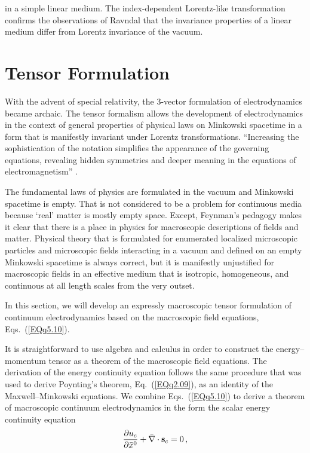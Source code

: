 \documentclass[twocolumn,amssymb,eqsecnum,aps,pra]{revtex4-2}
\begin{document}
in a simple linear medium.
The index-dependent Lorentz-like transformation confirms the
observations of Ravndal \cite{BIFinn} that the invariance properties
of a linear medium differ from Lorentz invariance of the vacuum.
\par
\section{Tensor Formulation}
\par
With the advent of special relativity, the 3-vector formulation of
electrodynamics became archaic.
The tensor formalism allows the development of electrodynamics in the
context of general properties of physical laws on Minkowski spacetime 
in a form that is manifestly invariant under Lorentz transformations.
``Increasing the sophistication of the notation simplifies the
appearance of the governing equations, revealing hidden symmetries
and deeper meaning in the equations of
electromagnetism'' \cite{BIWarnickR}.
\par
The fundamental laws of physics are formulated in the vacuum and
Minkowski spacetime is empty.
That is not considered to be a problem for continuous media
because `real' matter is mostly empty space.
Except, Feynman's \cite{BIFeynman} pedagogy makes it clear
that there is a place in physics for macroscopic descriptions of
fields and matter.
Physical theory that is formulated for enumerated localized
microscopic particles and microscopic fields interacting in a
vacuum and defined on an empty Minkowski spacetime is always
correct, but it is manifestly unjustified for macroscopic fields
in an effective medium that is isotropic, homogeneous, and
continuous at all length scales from the very outset.
\par
In this section, we will develop an expressly macroscopic tensor
formulation of continuum electrodynamics based on the macroscopic field
equations, Eqs.~(\ref{EQq5.10}).
\par
It is straightforward to use algebra and calculus in order to construct
the energy--momentum tensor as a theorem of the macroscopic field
equations.
The derivation of the energy continuity equation follows the same 
procedure that was used to derive Poynting's theorem,
Eq.~(\ref{EQq2.09}), as an identity of the Maxwell--Minkowski equations.
We combine Eqs.~(\ref{EQq5.10}) 
to derive a theorem of macroscopic continuum electrodynamics in the
form the scalar energy continuity equation
\begin{equation}
\frac{\partial{u_c}}{\partial \bar x^0} 
+\bar\nabla\cdot{\bf s}_c =0 \, ,
\label{EQq9.01}
\end{equation}
\end{document}
